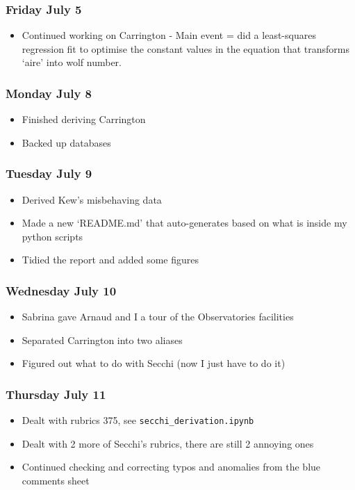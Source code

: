 \documentclass[12pt]{article}
\begin{document}
\subsubsection{Friday July 5}
\begin{itemize}
    \item Continued working on Carrington - Main event = did a least-squares regression fit to optimise the constant values in the equation that transforms `aire' into wolf number.
\end{itemize}

\subsubsection{Monday July 8}
\begin{itemize}
    \item Finished deriving Carrington
    \item Backed up databases
\end{itemize}

\subsubsection{Tuesday July 9}
\begin{itemize}
    \item Derived Kew's misbehaving data
    \item Made a new `README.md' that auto-generates based on what is inside my python scripts
    \item Tidied the report and added some figures
\end{itemize}

\subsubsection{Wednesday July 10}
\begin{itemize}
    \item Sabrina gave Arnaud and I a tour of the Observatories facilities
    \item Separated Carrington into two aliases
    \item Figured out what to do with Secchi (now I just have to do it)
\end{itemize}

\subsubsection{Thursday July 11}
\begin{itemize}
    \item Dealt with rubrics 375, see \texttt{secchi\_derivation.ipynb}
    \item Dealt with 2 more of Secchi's rubrics, there are still 2 annoying ones
    \item Continued checking and correcting typos and anomalies from the blue comments sheet
\end{itemize}
\end{document}
